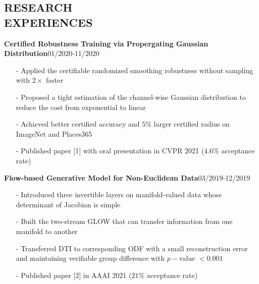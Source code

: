 \documentclass[margin]{res}
\begin{document}
\begin{resume}
\vspace{-1em}
\section{RESEARCH \\ EXPERIENCES}
                \textbf{Certified Robustness Training via Propergating Gaussian Distribution}\hfill 01/2020-11/2020
                \begin{itemize}\itemsep -2.2pt %
                 \item[-] Applied the certifiable randomized smoothing robustness without sampling with $2\times$ faster
                 \item[-] Proposed a tight estimation of the channel-wise Gaussian distribution to reduce the cost from exponential to linear
                 \item[-] Achieved better certified accuracy and $5\%$ larger certified radius on ImageNet and Places365
                 \item[-] Published paper [1] with oral presentation in CVPR 2021 ($4.6\%$ acceptance rate)
                 \end{itemize}

                 \vspace{-1em}  

                \textbf{Flow-based Generative Model for Non-Euclidean Data}\hfill 03/2019-12/2019
                \begin{itemize}\itemsep -2.2pt %
                 \item[-] Introduced three invertible layers on manifold-valued data whose determinant of Jacobian is simple
                 \item[-] Built the two-stream GLOW that can transfer information from one manifold to another
                 \item[-] Transferred DTI to corresponding ODF with a small reconstruction error and maintaining verifiable group difference with $p-$value $<0.001$
				\item[-] Published paper [2] in AAAI 2021 ($21\%$ acceptance rate)
                 \end{itemize}


\end{resume}
\end{document}
